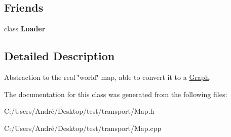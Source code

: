 \subsection*{Friends}
\begin{DoxyCompactItemize}
\item 
\hypertarget{class_map_ac8e5438321e35520c4088ff6ca4116ee}{}class {\bfseries Loader}\label{class_map_ac8e5438321e35520c4088ff6ca4116ee}

\end{DoxyCompactItemize}


\subsection{Detailed Description}
Abstraction to the real \char`\"{}world\char`\"{} map, able to convert it to a \hyperlink{class_graph}{Graph}. 

The documentation for this class was generated from the following files\+:\begin{DoxyCompactItemize}
\item 
C\+:/\+Users/\+André/\+Desktop/test/transport/Map.\+h\item 
C\+:/\+Users/\+André/\+Desktop/test/transport/Map.\+cpp\end{DoxyCompactItemize}
